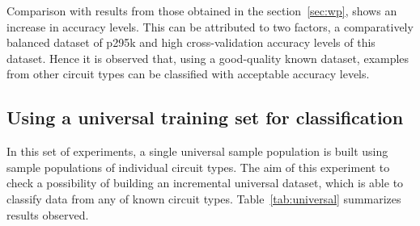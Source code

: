 Comparison with results from those obtained in the section~\ref{sec:wp}, shows an increase in accuracy levels. This can be attributed to two factors, a comparatively balanced dataset of p295k and high cross-validation accuracy levels of this dataset. Hence it is observed that, using a good-quality known dataset, examples from other circuit types can be classified with acceptable accuracy levels.

\subsection{Using a universal training set for classification}

In this set of experiments, a single universal sample population is built using sample populations of individual circuit types. The aim of this experiment to check a possibility of building an incremental universal dataset, which is able to classify data from any of known circuit types. Table~\ref{tab:universal} summarizes results observed.

